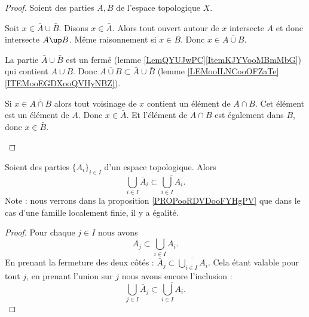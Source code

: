 \begin{proof}
	Soient des parties \( A,B\) de l'espace topologique \( X\).
	\begin{subproof}
		Soit \( x\in \bar A\cup\bar B\). Disons \( x\in\bar A\). Alors tout ouvert autour de \( x\) intersecte \( A\) et donc intersecte \( A\up B\). Même raisonnement si \( x\in B\). Donc \( x\in \overline{A\cup B}\).

		La partie \( \bar A\cup\bar B\) est un fermé (lemme \ref{LemQYUJwPC}\ref{ItemKJYVooMBmMbG}) qui contient \( A\cup B\). Donc \( \overline{A\cup B}\subset \bar A\cup\bar B\) (lemme \ref{LEMooILNCooOFZaTe}\ref{ITEMooEGDXooQVHyNBZ}).

		Si \( x\in \overline{A\cap B}\) alors tout voisinage de \( x\) contient un élément de \( A\cap B\). Cet élément est un élément de \( A\). Donc \( x\in \bar A\). Et l'élément de \( A\cap B\) est également dans \( B\), donc \( x\in \bar B\).
	\end{subproof}
\end{proof}

\begin{proposition}	\label{PROPooLPYFooOfIzxB}
	Soient des parties \( \{ A_i \}_{i\in I}\) d'un espace topologique. Alors
	\begin{equation}
		\bigcup_{i\in I}\bar A_i\subset \overline{\bigcup_{i\in I}A_i}.
	\end{equation}
	Note : nous verrons dans la proposition \ref{PROPooRDVDooFYHgPV} que dans le cas d'une famille localement finie, il y a égalité.
\end{proposition}

\begin{proof}
	Pour chaque \( j\in I\) nous avons
	\begin{equation}
		A_j\subset \bigcup_{i\in I}A_i.
	\end{equation}
	En prenant la fermeture des deux côtés : \( \bar A_j\subset\overline{\bigcup_{i\in I}A_i}\). Cela étant valable pour tout \( j\), en prenant l'union sur \( j\) nous avons encore l'inclusion  :
	\begin{equation}
		\bigcup_{j\in I}\bar A_j\subset\overline{\bigcup_{i\in I}A_i}.
	\end{equation}
\end{proof}


